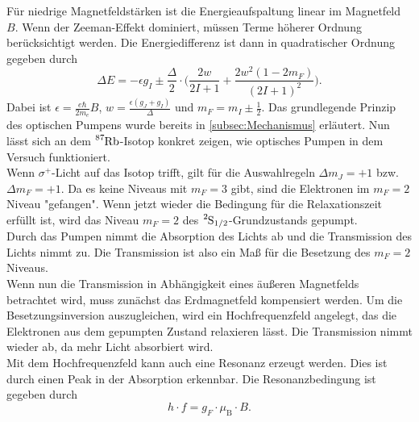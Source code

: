 Für niedrige Magnetfeldstärken ist die Energieaufspaltung linear im Magnetfeld $B$. Wenn der Zeeman-Effekt dominiert, müssen Terme höherer Ordnung berücksichtigt werden. Die Energiedifferenz ist dann
in quadratischer Ordnung gegeben durch
\begin{equation*}
    \Delta E = -\epsilon g_I \pm \frac{\Delta}{2} \cdot \bigg( \frac{2w}{2I+1} + \frac{2w^2(1-2m_F)}{(2I+1)^2}\bigg).
\end{equation*}
Dabei ist $\epsilon = \frac{e\hbar}{2m_e}B$, $w = \frac{\epsilon(g_J + g_I)}{\Delta}$ und $m_F = m_I \pm \frac{1}{2}$. Das grundlegende Prinzip des optischen Pumpens wurde bereits in \autoref{subsec:Mechanismus} erläutert.
Nun lässt sich an dem $\ce{^{87}Rb}$-Isotop konkret zeigen, wie optisches Pumpen in dem Versuch funktioniert.\\
Wenn $\sigma^+$-Licht auf das Isotop trifft, gilt für die Auswahlregeln $\Delta m_J = +1$ bzw. $\Delta m_F = +1$. Da es keine Niveaus mit $m_F = 3$ gibt, sind die Elektronen im $m_F = 2$ Niveau
"gefangen". Wenn jetzt wieder die Bedingung für die Relaxationszeit erfüllt ist, wird das Niveau $m_F = 2$ des $\ce{^{2}S_{1/2}}$-Grundzustands gepumpt.\\
Durch das Pumpen nimmt die Absorption des Lichts ab und die Transmission des Lichts nimmt zu. Die Transmission ist also ein Maß für die Besetzung des $m_F = 2$ Niveaus.\\
Wenn nun die Transmission in Abhängigkeit eines äußeren Magnetfelds betrachtet wird, muss zunächst das Erdmagnetfeld kompensiert werden. 
Um die Besetzungsinversion auszugleichen, wird ein Hochfrequenzfeld angelegt, das die Elektronen aus dem gepumpten Zustand relaxieren lässt. Die Transmission nimmt wieder ab, da mehr Licht
absorbiert wird.\\
Mit dem Hochfrequenzfeld kann auch eine Resonanz erzeugt werden. Dies ist durch einen Peak in der Absorption erkennbar. Die Resonanzbedingung ist gegeben durch
\begin{equation*}
    h \cdot f = g_F \cdot \mu_{\text{B}} \cdot B.
\end{equation*}


\newpage

